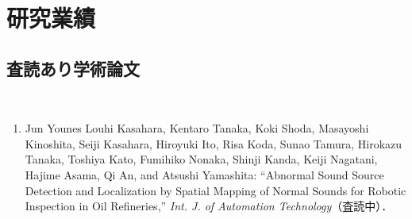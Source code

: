 \documentclass[../main]{subfiles}
\begin{document}
\chapter*{研究業績}
\label{achive}

\lhead[研究業績]{}
\thispagestyle{empty}

\newpage


\section*{査読あり学術論文}
\leavevmode \\


\begin{enumerate}
  \item Jun Younes Louhi Kasahara, Kentaro Tanaka, Koki Shoda, Masayoshi Kinoshita, Seiji Kasahara, Hiroyuki Ito, Risa Koda, Sunao Tamura, Hirokazu Tanaka, Toshiya Kato, Fumihiko Nonaka, Shinji Kanda, Keiji Nagatani, Hajime Asama, Qi An, and Atsushi Yamashita: ``Abnormal Sound Source Detection and Localization by Spatial Mapping of Normal Sounds for Robotic Inspection in Oil Refineries,'' \textit{Int. J. of Automation Technology}（査読中）．\\
\end{enumerate}



\end{document}
